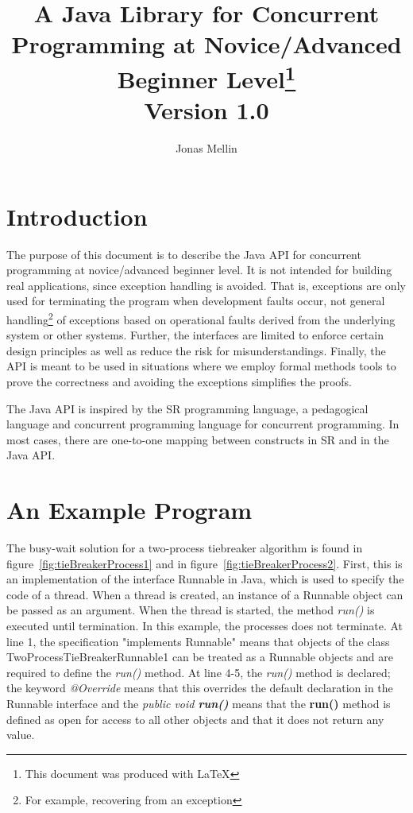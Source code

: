 \documentclass[11pt]{article} %
\title{A Java Library for Concurrent Programming at Novice/Advanced Beginner Level\thanks{This document was produced with \LaTeX}\\Version 1.0}
\author{Jonas Mellin}
\begin{document}
\maketitle

\section{Introduction}

The purpose of this document is to describe the Java API for concurrent programming at novice/advanced beginner level. It is not intended for building real applications, since exception handling is avoided. That is, exceptions are only used for terminating the program when development faults occur, not general handling\footnote{For example, recovering from an exception} of exceptions based on operational faults derived from the underlying system or other systems. Further, the interfaces are limited to enforce certain design principles as well as reduce the risk for misunderstandings. Finally, the API is meant to be used in situations where we employ formal methods tools to prove the correctness and avoiding the exceptions simplifies the proofs.

The Java API is inspired by the SR programming language, a pedagogical language and concurrent programming language for concurrent programming. In most cases, there are one-to-one mapping between constructs in SR and in the Java API. 



\section{An Example Program}

The busy-wait solution for a two-process tiebreaker algorithm is found in figure~\ref{fig:tieBreakerProcess1} and in figure~\ref{fig:tieBreakerProcess2}. First, this is an implementation of the interface Runnable in Java, which is used to specify the code of a thread. When a thread is created, an instance of a Runnable object can be passed as an argument. When the thread is started, the method \emph{ run()} is executed until termination. In this example, the processes does not terminate. At line 1, the specification "implements Runnable" means that objects of the class TwoProcessTieBreakerRunnable1 can be treated as a Runnable objects and are required to define the \emph{ run()} method. At line 4-5, the \emph{ run()} method is declared; the keyword \emph{@Override} means that this overrides the default declaration in the Runnable interface and the \emph{public  void {\bfseries run()}} means that the {\bfseries run()} method is defined as open for access to all other objects and that it does not return any value. 
\end{document}
